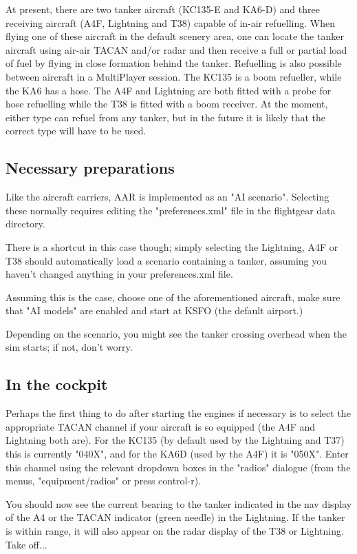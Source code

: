 At present, there are two tanker aircraft (KC135-E and KA6-D) and three
receiving aircraft (A4F, Lightning and T38) capable of in-air
refuelling.  When flying one of these aircraft in the default scenery
area, one can locate the tanker aircraft using air-air TACAN and/or
radar and then receive a full or partial load of fuel by flying in
close formation behind the tanker.  Refuelling is also possible between
aircraft in a MultiPlayer session. The KC135 is a boom refueller, while
the KA6 has a hose. The A4F and Lightning are both fitted with a probe
for hose refuelling while the T38 is fitted with a boom receiver. At
the moment, either type can refuel from any tanker, but in the future
it is likely that the correct type will have to be used.

\subsection{Necessary preparations}

Like the aircraft carriers, AAR is implemented as an "AI scenario". 
Selecting these normally requires editing the "preferences.xml" file in
the flightgear data directory.

There is a shortcut in this case though; simply selecting the
Lightning, A4F or T38 should automatically load a scenario containing a
tanker, assuming you haven't changed anything in your preferences.xml
file.

Assuming this is the case, choose one of the aforementioned aircraft,
make sure that "AI models" are enabled and start at KSFO (the default
airport.)

Depending on the scenario, you might see the tanker crossing overhead
when the sim starts; if not, don't worry.

\subsection{In the cockpit}

Perhaps the first thing to do after starting the engines if necessary
is to select the appropriate TACAN channel if your aircraft is so
equipped (the A4F and Lightning both are).  For the KC135 (by default
used by the Lightning and T37) this is currently "040X", and for the
KA6D (used by the A4F) it is "050X".  Enter this channel using the
relevant dropdown boxes in the "radios" dialogue (from the menus,
"equipment/radios" or press control-r).

You should now see the current bearing to the tanker indicated in the
nav display of the A4 or the TACAN indicator (green needle) in the
Lightning.  If the tanker is within range, it will also appear on the
radar display of the T38 or Lightning.  Take off...

